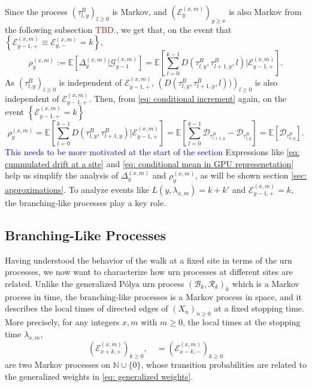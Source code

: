 \documentclass[twoside,12pt,a4paper]{article}
\numberwithin{equation}{section}
\newcommand\TBD{\textcolor{red}{TBD.}}
\newcommand{\comment}[1]{\textcolor{blue}{#1}}
\begin{document}
	Since the process $(\tau^B_{l,y})_{l\geq 0}$ is Markov, and  $ (\mathcal{E}^{(x,m)}_{y})_{ y \geq x} $ is also Markov from the following subsection \TBD, we get that, on the event that $ \left\{ \mathcal{E}^{(x,m)}_{y-1,+} \equiv \mathcal{E}^{(x,m)}_{y,-}  = k \right\}$,
	\[
		  \rho_{y}^{(x,m)} := 
		  \mathbb{E}\left[\Delta_{y}^{(x,m)} \vert \mathcal{G}_{y-1}^{(x,m)} \right] 
		= \mathbb{E}\left[ \sum_{l=0 }^{ k -1  }  D\left(\tau^{B}_{l,y},\tau^{B}_{l+1,y},l\right) \vert \mathcal{E}^{(x,m)}_{y-1,+} \right]. 
	\]
	As $\left(\tau^B_{l,y}\right)_{l \geq 0} $ is independent of $ \mathcal{E}^{(x,m)}_{y-1,+} $,  $\left(D\left(\tau^{B}_{l,y},\tau^{B}_{l+1,y},l\right))\right)_{l\geq 0}$ is also independent of $ \mathcal{E}^{(x,m)}_{y-1,+} $. Then, from \eqref{eq: conditional increment} again, on the event $\left\{\mathcal{E}^{(x,m)}_{y-1,+}  = k  \right \}$
	\begin{equation} \label{eq: conditional mean in GPU represenetation}
		\rho_{y}^{(x,m)} = \mathbb{E}\left[ \sum_{l=0 }^{ k -1  }  D(\tau^{B}_{l,y},\tau^{B}_{l+1,y} ) \vert \mathcal{E}^{(x,m)}_{y-1,+} \right]	= \mathbb{E}\left[ \sum_{l=0}^{k-1}  \mathcal{D}_{\tau^{B}_{l+1,y}} -\mathcal{D}_{\tau^{B}_{l,y}} \right]  
		= \mathbb{E}\left[  \mathcal{D}_{\tau^{B}_{k,y}} \right].
	\end{equation} 
	\comment{This needs to be more motivated at the start of the section}
	 Expressions like \eqref{eq: cummulated drift at a site} and \eqref{eq: conditional mean in GPU represenetation} help us simplify the analysis of $\Delta_{y}^{(x,m)}$ and $\rho_{y}^{(x,m)}$, as will be shown section \ref{sec: approximations}. To analyze events like $ L(y,\lambda_{x,m}) = k+k'$ and $\mathcal{E}^{(x,m)}_{y-1,+} = k $, the branching-like processes play a key role.
		
		
		\subsection{Branching-Like Processes}
		Having understood the behavior of the walk at a fixed site in terms of the urn processes, we now want to characterize how urn processes at different sites are related. Unlike the generalized P\'{o}lya urn process $(\mathcal{B}_k,\mathcal{R}_k )_k$ which is a Markov process in time, the branching-like processes is a Markov process in space, and it describes the local times of directed edges of $(X_n)_{n\geq 0}$ at a fixed stopping time.
		More precisely, for any integers $x,m$ with $m\geq 0$, the local times at the stopping time $\lambda_{x,m}$, 
		\[
		 \left(\mathcal{E}^{(x,m)}_{x+k,+} \right)_{k\geq 0}, \quad = \left(\mathcal{E}^{(x,m)}_{x-k,-} \right)_{k\geq 0}
		\]
		are two Markov processes on $\mathbb{N}\cup\{0\}$, whose transition probabilities are related to the generalized weights in \eqref{eq: generalized weights}.
		
\end{document}
